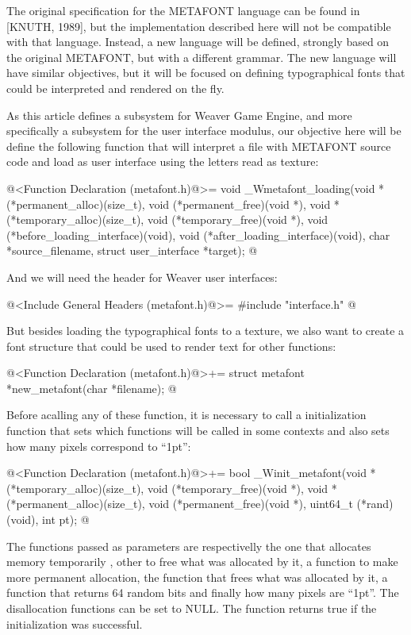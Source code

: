 The original specification for the METAFONT language can be found in
[KNUTH, 1989], but the implementation described here will not be
compatible with that language. Instead, a new language will be
defined, strongly based on the original METAFONT, but with a different
grammar. The new language will have similar objectives, but it will be
focused on defining typographical fonts that could be interpreted and
rendered on the fly.

As this article defines a subsystem for Weaver Game Engine, and more
specifically a subsystem for the user interface modulus, our objective
here will be define the following function that will interpret a file
with METAFONT source code and load as user interface using the letters
read as texture:

\iniciocodigo
@<Function Declaration (metafont.h)@>=
void _Wmetafont_loading(void *(*permanent_alloc)(size_t),
		      void (*permanent_free)(void *),
		      void *(*temporary_alloc)(size_t),
		      void (*temporary_free)(void *),
		      void (*before_loading_interface)(void),
		      void (*after_loading_interface)(void),
		      char *source_filename,
                      struct user_interface *target);
@
\fimcodigo

And we will need the header for Weaver user interfaces:

\iniciocodigo
@<Include General Headers (metafont.h)@>=
#include "interface.h"
@
\fimcodigo

But besides loading the typographical fonts to a texture, we also want
to create a font structure that could be used to render text for other
functions:

\iniciocodigo
@<Function Declaration (metafont.h)@>+=
struct metafont *new_metafont(char *filename);
@
\fimcodigo

Before acalling any of these function, it is necessary to call a
initialization function that sets which functions will be called in
some contexts and also sets how many pixels correspond to ``1pt'':

\iniciocodigo
@<Function Declaration (metafont.h)@>+=
bool _Winit_metafont(void *(*temporary_alloc)(size_t),
                     void (*temporary_free)(void *),
                     void *(*permanent_alloc)(size_t),
                     void (*permanent_free)(void *),
                     uint64_t (*rand)(void), int pt);
@
\fimcodigo

The functions passed as parameters are respectivelly the one that
allocates memory temporarily , other to free what was allocated by it,
a function to make more permanent allocation, the function that frees
what was allocated by it, a function that returns 64 random bits and
finally how many pixels are ``1pt''. The disallocation functions can
be set to NULL. The function returns true if the initialization was
successful.

